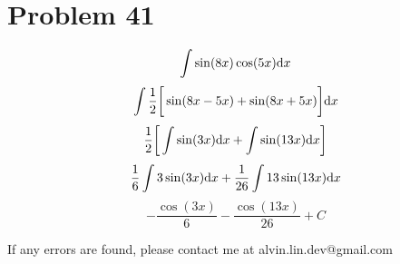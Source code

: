 \documentclass[letterpaper, 12pt]{math}
\begin{document}
\section*{Problem 41}
\[ \int{\sin(8x)\cos(5x)\mathrm{d}{x}} \]
\[ \int{\frac{1}{2}\bigg[\sin(8x-5x)+\sin(8x+5x)\bigg]\mathrm{d}{x}} \]
\[ \frac{1}{2}\bigg[\int{\sin(3x)\mathrm{d}{x}}+\int{\sin(13x)\mathrm{d}{x}}\bigg] \]
\[ \frac{1}{6}\int{3\sin(3x)\mathrm{d}{x}}+\frac{1}{26}\int{13\sin(13x)\mathrm{d}{x}} \]
\[ -\frac{\cos(3x)}{6}-\frac{\cos(13x)}{26}+C \]

\begin{center}
  If any errors are found, please contact me at alvin.lin.dev@gmail.com
\end{center}
\end{document}
